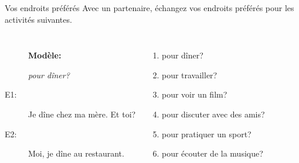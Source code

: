\begin{frame}{Vos endroits préférés }
  Avec un partenaire, échangez vos endroits préférés pour les activités suivantes. \\
  \begin{columns}
      \begin{description}
        \item[] \textbf{Modèle:}
        \item[] \emph{pour dîner?}
        \item[E1:] Je dîne chez ma mère. Et toi?
        \item[] 
        \item[E2:] Moi, je dîne au restaurant.
        \item[] 
      \end{description}
      \begin{enumerate}
        \item pour dîner?
        \item pour travailler?
        \item pour voir un film?
        \item pour discuter avec des amis?
        \item pour pratiquer un sport?
        \item pour écouter de la musique?
      \end{enumerate}
  \end{columns}
\end{frame}